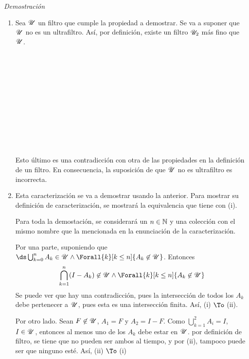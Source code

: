 \documentclass{article}
\theoremstyle{definition}
\begin{document}
\begin{proofbox}[10]{\textit{Demostración}}
  \begin{enumerate}
    \item Sea $\mathscr{U}$ un filtro que cumple la propiedad a demostrar.
          Se va a suponer que $\mathscr{U}$ no es un ultrafiltro. Así, por
          definición, existe un filtro $\mathscr{U}_2$ más fino que $\mathscr{U}$.
            \begin{longderivation}
                \\
              \equiv\\
                \\
              \\
                \\
              \\
                \\
              \equiv\\
                \\
              \\
            \end{longderivation}
          Esto último es una contradicción con otra de las propiedades en la definición
          de un filtro. En consecuencia, la suposición de que $\mathscr{U}$ no es ultrafiltro es
          incorrecta.
    \item Esta caracterización se va a demostrar usando la anterior. Para mostrar
          su definición de caracterización, se mostrará la equivalencia que tiene con (i).

          Para toda la demostación, se considerará un $n \in \mathbb{N}$ y una colección con el
          mismo nombre que la mencionada en la enunciación de la caracterización.
          
          Por una parte, suponiendo que $\ds\bigcup_{k=0}^n A_k \in \U \land
          \Forall{k}[k\leq n]{A_k \not\in \U}$. Entonces
          \[\bigcap_{k=1}^n (I-A_k) \not\in \U \land \Forall{k}[k\leq n]{A_k \not\in \U}\]
          Se puede ver que hay una contradicción, pues la intersección de todos los $A_k$
          debe pertenecer a $\mathscr{U}$, pues esta es una intersección finita. Así, (i) $\To$ (ii).

          Por otro lado. Sean $F \not\in \mathscr{U}$, $A_1 = F$ y $A_2 = I-F$. Como
          $\bigcup_{k=1}^{2} A_i = I$, $I \in \mathscr{U}$, entonces al menos uno de los
          $A_k$ debe estar en $\mathscr{U}$. por definición de filtro, se tiene que no pueden ser
          ambos al tiempo, y por (ii), tampoco puede ser que ninguno esté. Así, (ii) $\To$ (i)
  \end{enumerate}
\end{proofbox}
\end{document}
